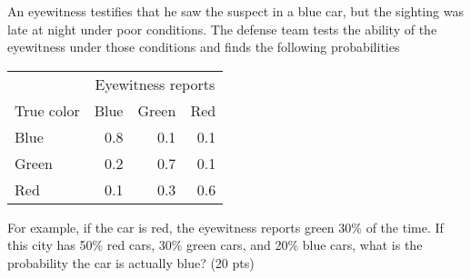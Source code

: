
\item An eyewitness testifies that he saw the suspect in a blue car, but the sighting was late at night under poor conditions. 
The defense team tests the ability of the eyewitness under those conditions and finds the following probabilities

\begin{center}
\begin{tabular}{l|rrr|}
& \multicolumn{3}{c|}{Eyewitness reports} \\
True color & Blue & Green & Red \\
\hline
Blue & 0.8 & 0.1 & 0.1 \\ 
Green & 0.2 & 0.7 & 0.1 \\
Red & 0.1 & 0.3 & 0.6 \\
\hline
\end{tabular}
\end{center}

For example, if the car is red, the eyewitness reports green 30\% of the time. 
If this city has 50\% red cars, 30\% green cars, and 20\% blue cars, what is the probability the car is actually blue? (20 pts)


\vfill


